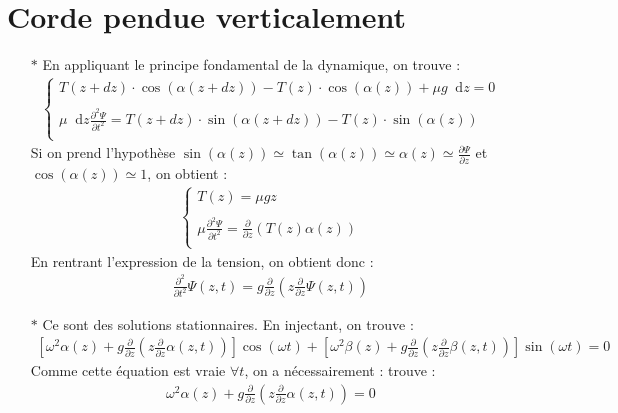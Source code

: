 \documentclass{report}
\newcommand*\dif{\mathop{}\!\mathrm{d}}
\begin{document}
\section*{Corde pendue verticalement}

\begin{itemize}

	\item[$\ast$] En appliquant le principe fondamental de la dynamique, on trouve :
	\begin{align*}
	\left\lbrace
	\begin{array}{ccc}
	T(z+dz)\cdot\cos(\alpha(z+dz))-T(z)\cdot\cos(\alpha(z))+\mu g\dif z=0\\
	\\
	\mu\dif z\frac{\partial^2\Psi}{\partial t^2}=T(z+dz)\cdot\sin(\alpha(z+dz))-T(z)\cdot\sin(\alpha(z))\\
	\end{array}\right.
	\end{align*}		
	Si on prend l'hypothèse $\sin(\alpha(z))\simeq\tan(\alpha(z))\simeq\alpha(z)\simeq\frac{\partial \Psi}{\partial z}$ et $\cos(\alpha(z))\simeq1$, on obtient :
	\begin{align*}
	\left\lbrace
	\begin{array}{ccc}
	T(z)=\mu gz\\
	\\
	\mu\frac{\partial^2\Psi}{\partial t^2}=\frac{\partial}{\partial z}(T(z)\alpha(z))\\
	\end{array}\right.
	\end{align*}		
	En rentrant l'expression de la tension, on obtient donc :
	\begin{align*}
		\frac{\partial^2}{\partial t^2}\Psi(z,t)=g\frac{\partial}{\partial z}\left( z\frac{\partial}{\partial z}\Psi(z,t)\right) 
	\end{align*}
	
		\item[$\ast$] Ce sont des solutions stationnaires. En injectant, on trouve :
		\begin{align*}
			\left[ \omega^2\alpha(z)+g\frac{\partial}{\partial z}\left( z\frac{\partial}{\partial z}\alpha(z,t)\right)\right] \cos(\omega t)+\left[ \omega^2\beta(z)+g\frac{\partial}{\partial z}\left( z\frac{\partial}{\partial z}\beta(z,t)\right)\right] \sin(\omega t)=0
		\end{align*}
		Comme cette équation est vraie $\forall t$, on a nécessairement :
trouve :
		\begin{align*}
			\omega^2\alpha(z)+g\frac{\partial}{\partial z}\left( z\frac{\partial}{\partial z}\alpha(z,t)\right)=0
		\end{align*}		
		

\end{itemize}
\end{document}
